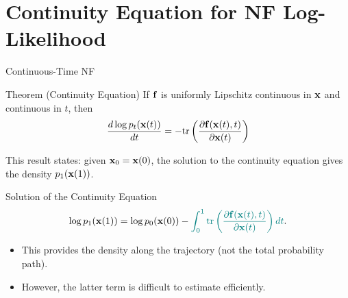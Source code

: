 \documentclass{beamer}
\renewcommand{\eqpause}{}
\begin{document}
\section{Continuity Equation for NF Log-Likelihood}
\begin{frame}{Continuous-Time NF}
	\begin{block}{Theorem (Continuity Equation)}
		If $\mathbf{f}$ is uniformly Lipschitz continuous in $\mathbf{x}$ and continuous in $t$, then
		\[
			\frac{d \log p_t(\mathbf{x}(t))}{d t} = - \text{tr} \left( \frac{\partial \mathbf{f}(\mathbf{x}(t), t)}{\partial \mathbf{x}(t)} \right)
		\]
		\vspace{-0.3cm}
	\end{block}
	\eqpause
	This result states: given $\mathbf{x}_0 = \mathbf{x}(0)$, the solution to the continuity equation gives the density $p_1(\mathbf{x}(1))$.
	\begin{block}{Solution of the Continuity Equation}
		\vspace{-0.3cm}
		\[
			\log p_1(\mathbf{x}(1)) = \log p_0(\mathbf{x}(0)) - {\color{teal}\int_{0}^{1} \text{tr}  \left( \frac{\partial \mathbf{f}(\mathbf{x}(t), t)}{\partial \mathbf{x}(t)} \right) dt}.
		\]
		\vspace{-0.3cm}
	\end{block}
	\eqpause
	\begin{itemize}
		\item This provides the density along the trajectory (not the total probability path).
		\item However, {\color{teal}the latter term} is difficult to estimate efficiently.
	\end{itemize}
\end{frame}
\end{document}
